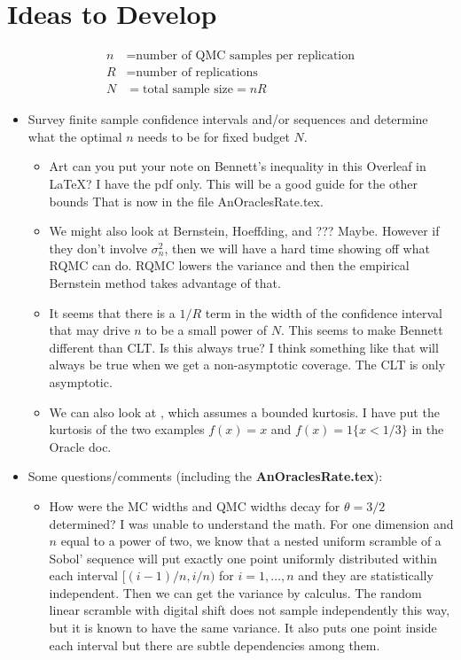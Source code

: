 \documentclass{amsart}
\newcommand{\art}[1]{{\color{blue}#1}}
\begin{document}
\section*{Ideas to Develop}
\begin{align*}
    n & = \text{number of QMC samples per replication} \\
    R & = \text{number of replications} \\
    N & = \text{total sample size} = nR
\end{align*}
\begin{itemize}
    \item Survey finite sample confidence intervals and/or sequences and determine what the optimal $n$ needs to be for fixed budget $N$.
    \begin{itemize}
        \item Art can you put your note on Bennett's inequality in this Overleaf in LaTeX?  I have the pdf only.  This will be a good guide for the other bounds \art{That is now in the file AnOraclesRate.tex.}
        \item We might also look at Bernstein, Hoeffding, and ???
        \art{Maybe.  However if they don't involve $\sigma^2_n$, then we will have a hard time showing off what RQMC can do. RQMC lowers the variance and then the empirical Bernstein method takes advantage of that.}
        \item It seems that there is a $1/R$ term in the width of the confidence interval that may drive $n$ to be a small power of $N$.  This seems to make Bennett different than CLT.  Is this always true?
        \art{I think something like that will always be true when we get a non-asymptotic coverage. The CLT is only asymptotic.}
        \item We can also look at \cite{HicEtal14a}, which assumes a bounded kurtosis. \art{I have put the kurtosis of the two examples $f(x)=x$ and $f(x) = 1\{x<1/3\}$ in the Oracle doc.}
    \end{itemize} 
\item Some questions/comments (including the \textbf{AnOraclesRate.tex}):
    \begin{itemize}
        \item How were the MC widths and QMC widths decay for $\theta = 3/2$ determined? I was unable to understand the math.
        \art{For one dimension and $n$ equal to a power of two, we know that a nested uniform scramble of a Sobol' sequence will put exactly one point uniformly distributed within each interval $[(i-1)/n,i/n)$ for $i=1,\dots,n$ and they are statistically independent. Then we can get the variance by calculus. The random linear scramble with digital shift does not sample independently this way, but it is known to have the same variance.  It also puts one point inside each interval but there are subtle dependencies among them.}

\end{itemize}
\end{itemize}
\end{document}
